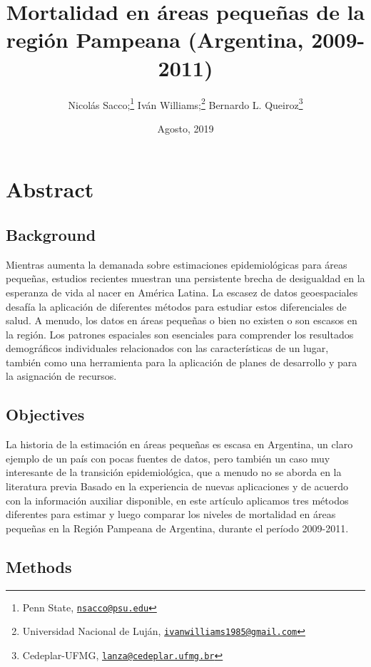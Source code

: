\documentclass[12pt,]{article}
\title{Mortalidad en áreas pequeñas de la región Pampeana (Argentina,
2009-2011)}
\author{Nicolás Sacco;\footnote{Penn State,
  \href{mailto:nsacco@psu.edu}{\nolinkurl{nsacco@psu.edu}}} Iván
Williams;\footnote{Universidad Nacional de Luján,
  \href{mailto:ivanwilliams1985@gmail.com}{\nolinkurl{ivanwilliams1985@gmail.com}}}
Bernardo L. Queiroz\footnote{Cedeplar-UFMG,
  \href{mailto:lanza@cedeplar.ufmg.br}{\nolinkurl{lanza@cedeplar.ufmg.br}}}}
\date{Agosto, 2019}
\begin{document}
\maketitle

\hypertarget{abstract}{%
\section{\texorpdfstring{\textbf{Abstract}}{Abstract}}\label{abstract}}

\hypertarget{background}{%
\subsection{\texorpdfstring{\textbf{Background}}{Background}}\label{background}}

Mientras aumenta la demanada sobre estimaciones epidemiológicas para
áreas pequeñas, estudios recientes muestran una persistente brecha de
desigualdad en la esperanza de vida al nacer en América Latina. La
escasez de datos geoespaciales desafía la aplicación de diferentes
métodos para estudiar estos diferenciales de salud. A menudo, los datos
en áreas pequeñas o bien no existen o son escasos en la región. Los
patrones espaciales son esenciales para comprender los resultados
demográficos individuales relacionados con las características de un
lugar, también como una herramienta para la aplicación de planes de
desarrollo y para la asignación de recursos.

\hypertarget{objectives}{%
\subsection{\texorpdfstring{\textbf{Objectives}}{Objectives}}\label{objectives}}

La historia de la estimación en áreas pequeñas es escasa en Argentina,
un claro ejemplo de un país con pocas fuentes de datos, pero también un
caso muy interesante de la transición epidemiológica, que a menudo no se
aborda en la literatura previa Basado en la experiencia de nuevas
aplicaciones y de acuerdo con la información auxiliar disponible, en
este artículo aplicamos tres métodos diferentes para estimar y luego
comparar los niveles de mortalidad en áreas pequeñas en la Región
Pampeana de Argentina, durante el período 2009-2011.

\hypertarget{methods}{%
\subsection{\texorpdfstring{\textbf{Methods}}{Methods}}\label{methods}}
\end{document}
